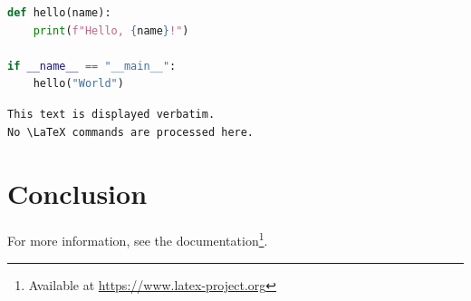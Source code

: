 \documentclass[12pt,a4paper]{article}
\begin{document}
\begin{lstlisting}[language=Python, caption=Hello World]
def hello(name):
    print(f"Hello, {name}!")

if __name__ == "__main__":
    hello("World")
\end{lstlisting}

\begin{verbatim}
This text is displayed verbatim.
No \LaTeX commands are processed here.
\end{verbatim}

\section{Conclusion}

For more information, see the documentation\footnote{Available at
\url{https://www.latex-project.org}}.



\end{document}
